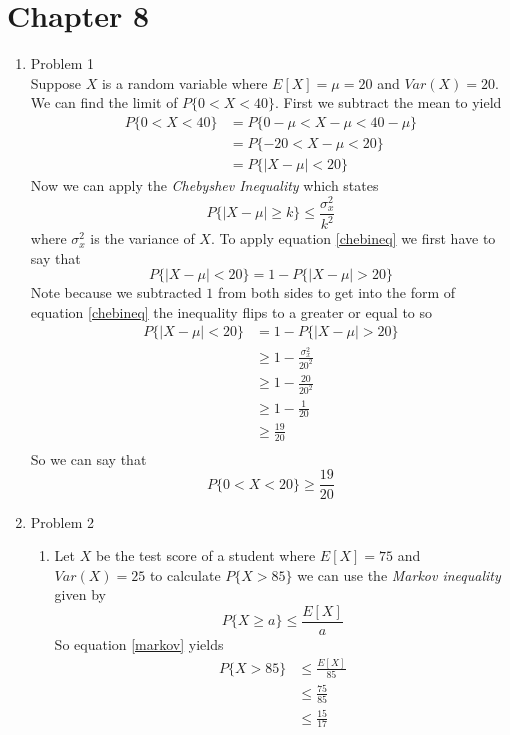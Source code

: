 \documentclass[11pt]{article}
\begin{document}

\section{Chapter 8}
\begin{enumerate}
\item Problem 1\\
Suppose $X$ is a random variable where $E[X] = \mu = 20$ and $Var(X) = 20$. We can find the limit of $P\{0<X<40\}$. First we subtract the mean to yield
\begin{align*}
P\{0<X<40\} &= P\{0-\mu<X-\mu<40-\mu\}\\
&= P\{-20<X-\mu<20\}\\
&= P\{|X-\mu|<20\}
\end{align*}
Now we can apply the \emph{Chebyshev Inequality} which states
\begin{equation} 
P\{|X-\mu|\ge k\} \le \frac{\sigma_x^2}{k^2}
\label{chebineq} 
\end{equation} 
where $\sigma_x^2$ is the variance of $X$. To apply equation \ref{chebineq} we first have to say that
$$P\{|X-\mu|<20\} = 1 - P\{|X-\mu|>20\}$$
Note because we subtracted $1$ from both sides to get into the form of equation \ref{chebineq} the inequality flips to a greater or equal to so
\begin{align*}
P\{|X-\mu|<20\} &= 1 - P\{|X-\mu|>20\}\\
&\ge 1 - \frac{\sigma_x^2}{20^2}\\
&\ge 1 - \frac{20}{20^2}\\
&\ge 1 - \frac{1}{20}\\
&\ge \frac{19}{20}\\
\end{align*}
So we can say that
$$P\{0<X<20\} \ge \frac{19}{20}$$

\item Problem 2
\begin{enumerate}
\item
Let $X$ be the test score of a student where $E[X] = 75$ and $Var(X) = 25$ to calculate $P\{X>85\}$ we can use the \emph{Markov inequality} given by
\begin{equation}
P\{X\ge a\} \le \frac{E[X]}{a}
\label{markov}
\end{equation}
So equation \ref{markov} yields
\begin{align*}
P\{X>85\} &\le \frac{E[X]}{85}\\
&\le \frac{75}{85}\\
&\le \frac{15}{17}
\end{align*}


\end{enumerate}
\end{enumerate}
\end{document}
